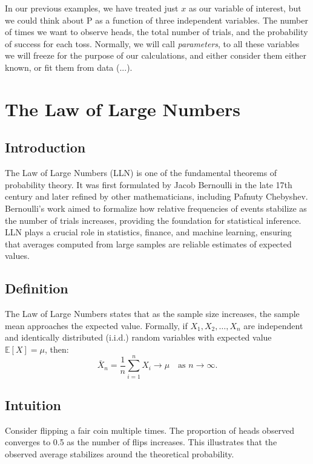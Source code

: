 \documentclass{book}
\begin{document}
In our previous examples, we have treated just $x$ as our variable of interest, but we could think about P as a function of three independent variables. The number of times we want to observe heads, the total number of trials, and the probability of success for each toss. Normally, we will call \textit{parameters}, to all these variables we will freeze for the purpose of our calculations, and either consider them either known, or fit them from data (...).
 
 \newpage 
 
\section{The Law of Large Numbers}

\subsection*{Introduction}
The Law of Large Numbers (LLN) is one of the fundamental theorems of probability theory. It was first formulated by Jacob Bernoulli in the late 17th century and later refined by other mathematicians, including Pafnuty Chebyshev. Bernoulli's work aimed to formalize how relative frequencies of events stabilize as the number of trials increases, providing the foundation for statistical inference. LLN plays a crucial role in statistics, finance, and machine learning, ensuring that averages computed from large samples are reliable estimates of expected values.

\subsection{Definition}
The Law of Large Numbers states that as the sample size increases, the sample mean approaches the expected value. Formally, if $X_1, X_2, \dots, X_n$ are independent and identically distributed (i.i.d.) random variables with expected value $\mathbb{E}[X] = \mu$, then:
\begin{equation}
    \bar{X}_n = \frac{1}{n} \sum_{i=1}^{n} X_i \to \mu \quad \text{as } n \to \infty.
\end{equation}

\subsection{Intuition}
Consider flipping a fair coin multiple times. The proportion of heads observed converges to 0.5 as the number of flips increases. This illustrates that the observed average stabilizes around the theoretical probability.
\end{document}
